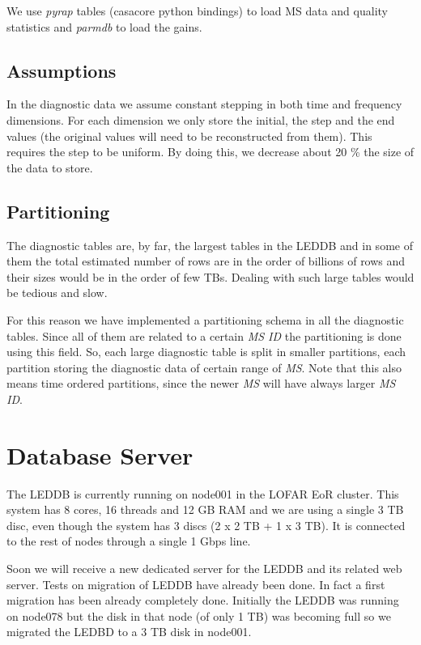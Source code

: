 \documentclass[a4paper,11pt]{article}
\begin{document}
We use \textit{pyrap} tables (casacore python bindings) to load MS data and quality statistics and \textit{parmdb} to load the gains.

\subsection{Assumptions}

In the diagnostic data we assume constant stepping in both time and frequency dimensions. For each dimension we only store the initial, the step and the end values (the original values will need to be reconstructed from them). This requires the step to be uniform. By doing this, we decrease about 20 \%  the size of the data to store. 

\subsection{Partitioning}

The diagnostic tables are, by far, the largest tables in the LEDDB and in some of them the total estimated number of rows are in the order of billions of rows and their sizes would be in the order of few TBs. Dealing with such large tables would be tedious and slow.

For this reason we have implemented a partitioning schema in all the diagnostic tables. Since all of them are related to a certain \textit{MS ID} the partitioning is done using this field. So, each large diagnostic table is split in smaller partitions, each partition storing the diagnostic data of certain range of \textit{MS}. Note that this also means time ordered partitions, since the newer \textit{MS} will have always larger \textit{MS ID}.

\section{Database Server}

The LEDDB is currently running on node001 in the LOFAR EoR cluster. This system has 8 cores, 16 threads and 12 GB RAM and we are using a single 3 TB disc, even though the system has 3 discs (2 x 2 TB + 1 x 3 TB). It is connected to the rest of nodes through a single 1 Gbps line.

Soon we will receive a new dedicated server for the LEDDB and its related web server. Tests on migration of LEDDB have already been done. In fact a first migration has been already completely done. Initially the LEDDB was running on node078 but the disk in that node (of only 1 TB) was becoming full so we migrated the LEDBD to a 3 TB disk in node001.
\end{document}
